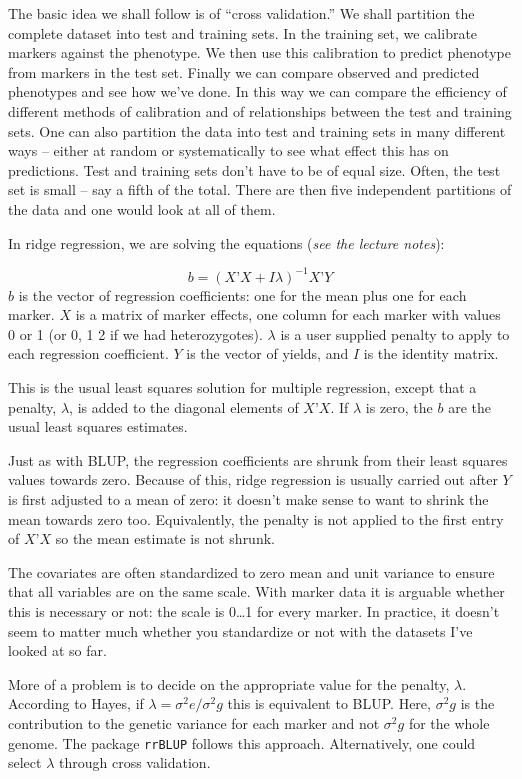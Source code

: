 \documentclass[
]{book}
\begin{document}
The basic idea we shall follow is of ``cross validation.'' We shall partition the complete
dataset into test and training sets. In the training set, we calibrate markers against the
phenotype. We then use this calibration to predict phenotype from markers in the test set.
Finally we can compare observed and predicted phenotypes and see how we've done. In this way we can compare the efficiency of different methods of calibration and of relationships between the test and training sets. One can also partition the data into test and training sets in many different ways -- either at random or systematically to see what effect this has on predictions. Test and training sets don't have to be of equal size. Often, the test set is small -- say a fifth of the total. There are then five independent partitions of the data and one would look at all of them.

In ridge regression, we are solving the equations (\emph{see the lecture notes}):

\[b = (X’X+Iλ)^{-1} X’Y\]
\(b\) is the vector of regression coefficients: one for the mean plus one for each marker. \(X\) is a matrix of marker effects, one column for each marker with values 0 or 1 (or 0, 1 2 if we had heterozygotes). \(λ\) is a user supplied penalty to apply to each regression coefficient. \(Y\) is the vector of yields, and \(I\) is the identity matrix.

This is the usual least squares solution for multiple regression, except that a penalty, \(λ\), is added to the diagonal elements of \(X’X\). If \(λ\) is zero, the \(b\) are the usual least squares estimates.

Just as with BLUP, the regression coefficients are shrunk from their least squares values
towards zero. Because of this, ridge regression is usually carried out after \(Y\) is first adjusted to a mean of zero: it doesn't make sense to want to shrink the mean towards zero too. Equivalently, the penalty is not applied to the first entry of \(X’X\) so the mean estimate is not shrunk.

The covariates are often standardized to zero mean and unit variance to ensure that all
variables are on the same scale. With marker data it is arguable whether this is necessary or
not: the scale is 0\ldots1 for every marker. In practice, it doesn't seem to matter much whether you standardize or not with the datasets I've looked at so far.

More of a problem is to decide on the appropriate value for the penalty, \(λ\). According to
Hayes, if \(λ = σ^2e / σ^2g\) this is equivalent to BLUP. Here, \(σ^2g\) is the contribution to the genetic variance for each marker and not \(σ^2g\) for the whole genome. The package \texttt{rrBLUP} \citep{Endelman2011} follows this approach. Alternatively, one could select \(λ\) through cross validation.
\end{document}
